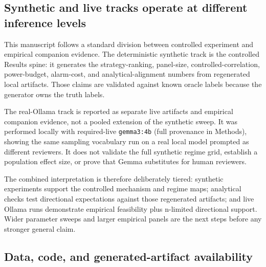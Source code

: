 \documentclass[
]{article}
\begin{document}
\subsection{Synthetic and live tracks operate at different inference
levels}\label{synthetic-and-live-tracks-operate-at-different-inference-levels}

This manuscript follows a standard division between controlled
experiment and empirical companion evidence. The deterministic synthetic
track is the controlled Results spine: it generates the
strategy-ranking, panel-size, controlled-correlation, power-budget,
alarm-cost, and analytical-alignment numbers from regenerated local
artifacts. Those claims are validated against known oracle labels
because the generator owns the truth labels.

The real-Ollama track is reported as separate live artifacts and
empirical companion evidence, not a pooled extension of the synthetic
sweep. It was performed locally with required-live \texttt{gemma3:4b}
(full provenance in Methods), showing the same sampling vocabulary run
on a real local model prompted as different reviewers. It does not
validate the full synthetic regime grid, establish a population effect
size, or prove that Gemma substitutes for human reviewers.

The combined interpretation is therefore deliberately tiered: synthetic
experiments support the controlled mechanism and regime maps; analytical
checks test directional expectations against those regenerated
artifacts; and live Ollama runs demonstrate empirical feasibility plus
n-limited directional support. Wider parameter sweeps and larger
empirical panels are the next steps before any stronger general claim.

\subsection{Data, code, and generated-artifact
availability}\label{data-code-and-generated-artifact-availability}
\end{document}
